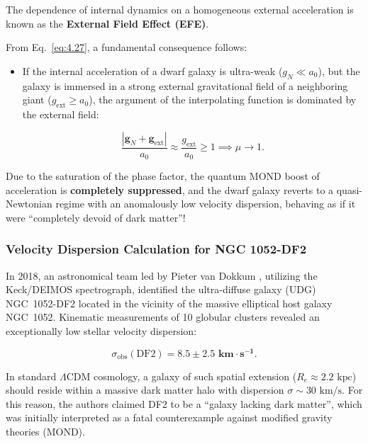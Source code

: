 The dependence of internal dynamics on a homogeneous external acceleration is known as the \textbf{External Field Effect (EFE)}.

From Eq.~\eqref{eq:4.27}, a fundamental consequence follows:

\begin{itemize}
\item If the internal acceleration of a dwarf galaxy is ultra-weak ($g_N \ll a_0$), but the galaxy is immersed in a strong external gravitational field of a neighboring giant ($g_{\text{ext}} \ge a_0$), the argument of the interpolating function is dominated by the external field:

\begin{equation}\label{eq:4.28}\tag{4.28}
\frac{|\mathbf{g}_N + \mathbf{g}_{\text{ext}}|}{a_0} \approx \frac{g_{\text{ext}}}{a_0} \ge 1 \implies \mu \to 1.
\end{equation}
\end{itemize}

Due to the saturation of the phase factor, the quantum MOND boost of acceleration is \textbf{completely suppressed}, and the dwarf galaxy reverts to a quasi-Newtonian regime with an anomalously low velocity dispersion, behaving as if it were ``completely devoid of dark matter''!


\subsubsection{Velocity Dispersion Calculation for NGC 1052-DF2}\label{sec:4.3.2}

In 2018, an astronomical team led by Pieter van Dokkum \cite{ref28}, utilizing the Keck/DEIMOS spectrograph, identified the ultra-diffuse galaxy (UDG) NGC~1052-DF2 located in the vicinity of the massive elliptical host galaxy NGC~1052. Kinematic measurements of 10 globular clusters revealed an exceptionally low stellar velocity dispersion:

\begin{equation}\label{eq:4.29}\tag{4.29}
\sigma_{\text{obs}}(\text{DF2}) = \mathbf{8.5 \pm 2.5\text{ km}\cdot\text{s}^{-1}}.
\end{equation}

In standard $\Lambda\text{CDM}$ cosmology, a galaxy of such spatial extension ($R_e \approx 2.2\text{ kpc}$) should reside within a massive dark matter halo with dispersion $\sigma \sim 30\text{ km/s}$. For this reason, the authors claimed DF2 to be a ``galaxy lacking dark matter'', which was initially interpreted as a fatal counterexample against modified gravity theories (MOND).


